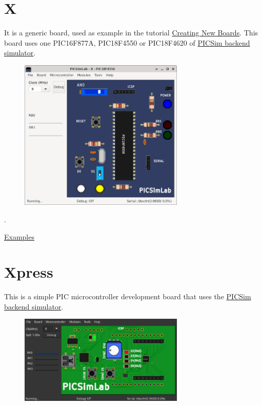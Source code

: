 \section{X}

It is a generic board, used as example in the tutorial 
\href{https://lcgamboa.github.io/picsimlab_docs/stable/CreatingNewBoards.html}{Creating New Boards}.
This board uses one PIC16F877A, PIC18F4550 or PIC18F4620 of \hyperlink{def:PICSim}{PICSim backend simulator}.

\begin{figure}[H]
\center
\includegraphics[width=0.7\textwidth]{img/X.png} 
\end{figure} 

.\vspace{0.5cm}

\href{https://lcgamboa.github.io/picsimlab_examples/board_X.html}{Examples}


\section{Xpress}

This is a simple PIC microcontroller development board that uses the
\hyperlink{def:PICSim}{PICSim backend simulator}.

\begin{figure}[H]
\center
\includegraphics[width=0.7\textwidth]{img/Xpress.png} 
\end{figure} 

